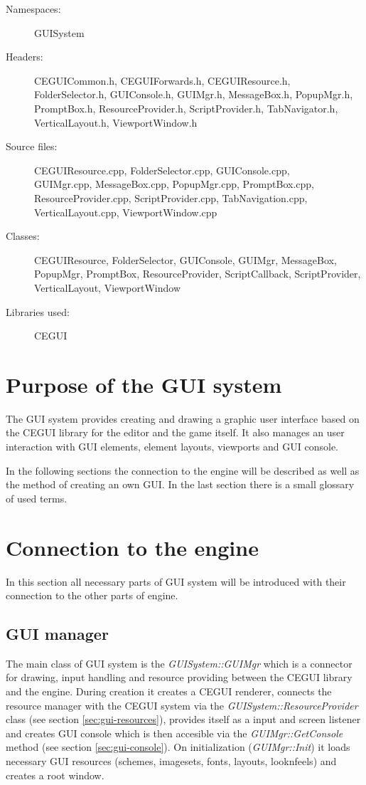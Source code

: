 \begin{description}
  \item[Namespaces:] GUISystem
  \item[Headers:] CEGUICommon.h, CEGUIForwards.h, CEGUIResource.h, FolderSelector.h, GUIConsole.h, GUIMgr.h, MessageBox.h, PopupMgr.h, Prompt\-Box.h, ResourceProvider.h, ScriptProvider.h, TabNavigator.h, VerticalLayout.h, ViewportWindow.h
  \item[Source files:] CEGUIResource.cpp, FolderSelector.cpp, GUIConsole.cpp, \\GUIMgr.cpp, MessageBox.cpp, PopupMgr.cpp, PromptBox.cpp, Re\-sourceProvider.cpp, ScriptProvider.cpp, TabNavigation.cpp, Ver\-ti\-cal\-Layout.cpp, ViewportWindow.cpp
  \item[Classes:] CEGUIResource, FolderSelector, GUIConsole, GUIMgr, MessageBox, PopupMgr, PromptBox, ResourceProvider, ScriptCallback, ScriptProvider, VerticalLayout, ViewportWindow
  \item[Libraries used:] CEGUI
\end{description}

\section{Purpose of the GUI system}

The GUI system provides creating and drawing a graphic user interface based on the CEGUI library for the editor and the game itself. It also manages an user interaction with GUI elements, element layouts, viewports and GUI console.

In the following sections the connection to the engine will be described as well as the method of creating an own GUI. In the last section there is a small glossary of used terms.

\section{Connection to the engine}

In this section all necessary parts of GUI system will be introduced with their connection to the other parts of engine.

\subsection{GUI manager}

The main class of GUI system is the \emph{GUISystem::GUIMgr} which is a connector for drawing, input handling and resource providing between the CEGUI library and the engine. During creation it creates a CEGUI renderer, connects the resource manager with the CEGUI system via the \emph{GUISystem::Resource\-Provider} class (see section \ref{sec:gui-resources}), provides itself as a input and screen listener and creates GUI console which is then accesible via the \emph{GUIMgr::GetConsole} method (see section \ref{sec:gui-console}). On initialization (\emph{GUIMgr::Init}) it loads necessary GUI resources (schemes, imagesets, fonts, layouts, looknfeels) and creates a root window.

